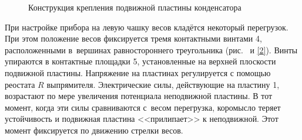 \begin{wrapfigure}{r}{0.4\textwidth}
	\caption{Конструкция крепления подвижной пластины конденсатора}
\end{wrapfigure}

При настройке прибора на левую чашку весов кладётся некоторый перегрузок. При этом положение весов фиксируется тремя
контактными винтами 4, расположенными в~вершинах равностороннего треугольника (рис.~ и \eqref{2}). Винты упираются в
контактные площадки 5, установленные на верхней плоскости подвижной пластины. Напряжение на пластинах регулируется с
помощью реостата $R$ выпрямителя. Электрические силы, действующие на пластину 1, возрастают по мере увеличения
потенциала неподвижной пластины. В тот момент, когда эти силы сравниваются с~весом перегрузка, коромысло теряет
устойчивость и подвижная пластина <<прилипает>> к неподвижной. Этот момент фиксируется по движению стрелки весов.

